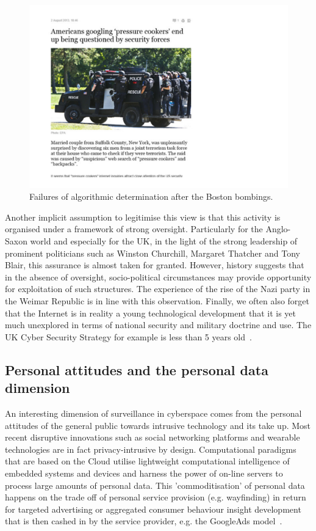 \documentclass{llncs}
\begin{document}
\begin{figure}
\begin{center}
\includegraphics[scale=0.4]{fig3}
\caption{Failures of algorithmic determination after the Boston bombings.}
\label{fig:Algo}
\end{center}
\end{figure}

Another implicit assumption to legitimise this view is that this activity is organised under a framework of strong oversight. Particularly for the Anglo-Saxon world and especially for the UK, in the light of the strong leadership of prominent politicians such as Winston Churchill, Margaret Thatcher and Tony Blair, this assurance is almost taken for granted. However, history suggests that in the absence of oversight, socio-political circumstances may provide opportunity for exploitation of such structures. The experience of the rise of the Nazi party in the Weimar Republic is in line with this observation. Finally, we often also forget that the Internet is in reality a young technological development that it is yet much unexplored in terms of national security and military doctrine and use. The UK Cyber Security Strategy for example is less than 5 years old~\cite{Cyber}.

\subsection{Personal attitudes and the personal data dimension}
An interesting dimension of surveillance in cyberspace comes from the personal attitudes of the general public towards intrusive technology and its take up. Most recent disruptive innovations such as social networking platforms and wearable technologies are in fact privacy-intrusive by design. Computational paradigms that are based on the Cloud utilise lightweight computational intelligence of embedded systems and devices and harness the power of on-line servers to process large amounts of personal data. This 'commoditisation' of personal data happens on the trade off of personal service provision (e.g. wayfinding) in return for targeted advertising or aggregated consumer behaviour insight development that is then cashed in by the service provider, e.g. the GoogleAds model~\cite{GoogleAds}.
\end{document}
